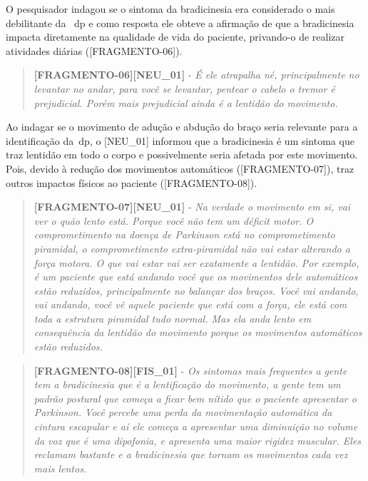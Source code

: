 O pesquisador indagou se o sintoma da bradicinesia era considerado o mais debilitante da ~\ac{dp} e como resposta ele obteve a afirmação de que a bradicinesia impacta diretamente na qualidade de vida do paciente, privando-o de realizar atividades diárias ([FRAGMENTO-06]).

\begin{quote}
\textbf{[FRAGMENTO-06][NEU\_01]} - 
\emph{
É ele atrapalha né, principalmente no levantar no andar, para você se levantar, pentear o cabelo o tremor é prejudicial. Porém mais prejudicial ainda é a lentidão do movimento.
}
\end{quote}

Ao indagar se o movimento de adução e abdução do braço seria relevante para a identificação da~\ac{dp}, o [NEU\_01] informou que a bradicinesia é um sintoma que traz lentidão em todo o corpo e possivelmente seria afetada por este movimento. Pois, devido à redução dos movimentos automáticos ([FRAGMENTO-07]), traz outros impactos físicos ao paciente ([FRAGMENTO-08]).

\begin{quote}
\textbf{[FRAGMENTO-07][NEU\_01]} - 
\emph{
Na verdade o movimento em si, vai ver o quão lento está. Porque você não tem um déficit motor. O comprometimento na doença de Parkinson está no comprometimento piramidal, o comprometimento extra-piramidal não vai estar alterando a força motora. O que vai estar vai ser exatamente a lentidão. Por exemplo, é um paciente que está andando você que os movimentos dele automáticos estão reduzidos, principalmente no balançar dos braços. Você vai andando, vai andando, você vê aquele paciente que está com a força, ele está com toda a estrutura piramidal tudo normal. Mas ela anda lento em consequência da lentidão do movimento porque os movimentos automáticos estão reduzidos.
}
\end{quote}


\begin{quote}
\textbf{[FRAGMENTO-08][FIS\_01]} - 
\emph{
Os sintomas mais frequentes a gente tem a bradicinesia que é a lentificação do movimento, a gente tem um padrão postural que começa a ficar bem nítido que o paciente apresentar o Parkinson. Você percebe uma perda da movimentação automática da cintura escapular e aí ele começa a apresentar uma diminuição no volume da voz que é uma dipofonia, e apresenta uma maior rigidez muscular. Eles reclamam bastante e a bradicinesia que tornam os movimentos cada vez mais lentos.
}
\end{quote}

